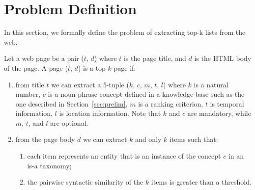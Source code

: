 \section{Problem Definition}
\label{sec:problem}
%
%
%

In this section, we formally define the problem of extracting top-k
lists from the web.

Let a web page be a pair ($t$, $d$) where $t$ is the page title, and
$d$ is the HTML body of the page.
A page ($t$, $d$) is a top-$k$ page if:
\begin{enumerate}
\item from title $t$ we can extract a 5-tuple ($k$, $c$, $m$, $t$,
  $l$) where $k$ is a natural number, $c$ is a noun-phrase concept
  defined in a knowledge base such as the one described in
  Section~\ref{sec:prelim}, $m$ is a ranking criterion, $t$ is
  temporal information, $l$ is location information. Note that $k$ and
  $c$ are mandatory, while $m$, $t$, and $l$ are optional.
\item from the page body $d$ we can extract $k$ and only $k$ items
  such that:
\begin{enumerate}
\item each item represents an entity that is an instance of the
  concept $c$ in an is-a  taxonomy;
\item the pairwise syntactic similarity of the $k$ items is greater
than a threshold.
\end{enumerate}
\end{enumerate}

